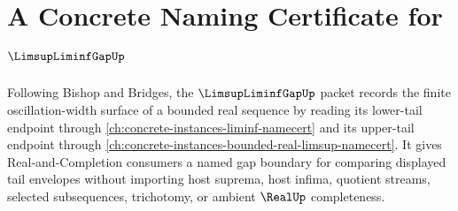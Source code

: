 \chapter{A Concrete Naming Certificate for $\LimsupLiminfGapUp$}
\label{ch:concrete-instances-limsup-liminf-gap-namecert}

Following Bishop and Bridges, the $\LimsupLiminfGapUp$ packet records the finite oscillation-width surface of a bounded real sequence by reading its lower-tail endpoint through \autoref{ch:concrete-instances-liminf-namecert} and its upper-tail endpoint through \autoref{ch:concrete-instances-bounded-real-limsup-namecert}. It gives Real-and-Completion consumers a named gap boundary for comparing displayed tail envelopes without importing host suprema, host infima, quotient streams, selected subsequences, trichotomy, or ambient $\RealUp$ completeness.

